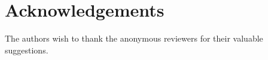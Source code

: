\documentclass[]{IEEEphot}
\begin{document}

\section*{Acknowledgements}
The authors wish to thank the anonymous reviewers for their valuable suggestions.  






\end{document}
